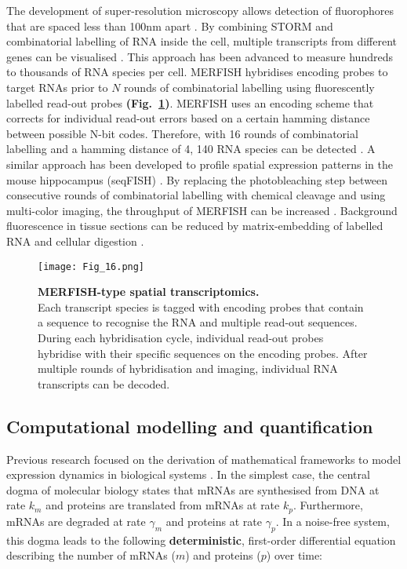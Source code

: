 The development of super-resolution microscopy allows detection of fluorophores that are spaced less than 100nm apart \citep{Sydor2015}. 
By combining \gls{STORM} and combinatorial labelling of RNA inside the cell, multiple transcripts from different genes can be visualised \citep{Lubeck2012}. 
This approach has been advanced to measure hundreds to thousands of RNA species per cell. 
\Gls{MERFISH} hybridises encoding probes to target RNAs prior to $N$ rounds of combinatorial labelling using fluorescently labelled read-out probes \textbf{(Fig.~\ref{fig0:MERFISH})}. 
MERFISH uses an encoding scheme that corrects for individual read-out errors based on a certain hamming distance between possible N-bit codes. 
Therefore, with 16 rounds of combinatorial labelling and a hamming distance of 4, 140 RNA species can be detected \citep{Chen2015}. A similar approach has been developed to profile spatial expression patterns in the mouse hippocampus (seqFISH) \citep{Shah2016}. 
By replacing the photobleaching step between consecutive rounds of combinatorial labelling with chemical cleavage and using multi-color imaging, the throughput of MERFISH can be increased \citep{Moffitt2016a}. 
Background fluorescence in tissue sections can be reduced by matrix-embedding of labelled RNA and cellular digestion \citep{Moffitt2016}.

\begin{figure}[!h]
\centering
\texttt{[image: Fig\_16.png]}
\caption[MERFISH-type spatial transcriptomics]{\textbf{MERFISH-type spatial transcriptomics.}\\
Each transcript species is tagged with encoding probes that contain a sequence to recognise the RNA and multiple read-out sequences. 
During each hybridisation cycle, individual read-out probes hybridise with their specific sequences on the encoding probes. 
After multiple rounds of hybridisation and imaging, individual RNA transcripts can be decoded.}
\label{fig0:MERFISH}
\end{figure}

\subsection{Computational modelling and quantification}

Previous research focused on the derivation of mathematical frameworks to model expression dynamics in biological systems \citep{Tsimring2014}. 
In the simplest case, the central dogma of molecular biology states that mRNAs are synthesised from DNA at rate $k_m$ and proteins are translated from mRNAs at rate $k_p$. 
Furthermore, mRNAs are degraded at rate $\gamma_m$ and proteins at rate $\gamma_p$. 
In a noise-free system, this dogma leads to the following \textbf{deterministic}, first-order differential equation describing the number of mRNAs ($m$) and proteins ($p$) over time:

